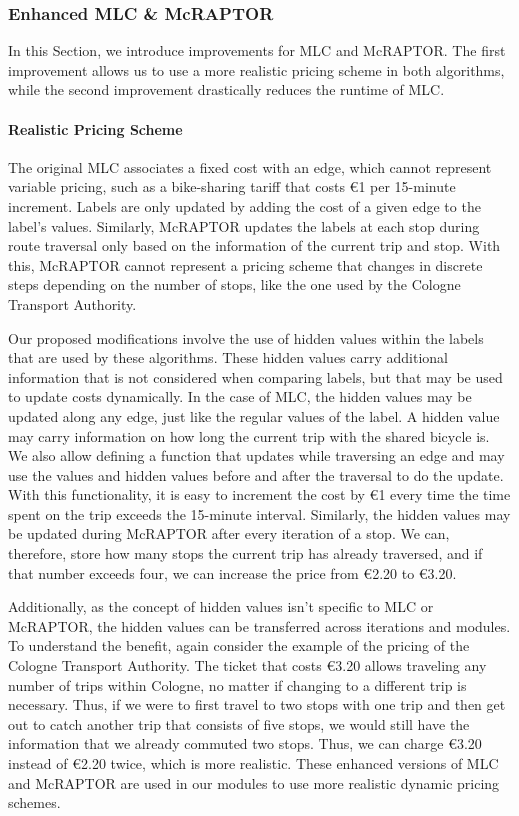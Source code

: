 \subsubsection{Enhanced MLC \& McRAPTOR}
\label{subsubsec:enhanced_mlc_and_mcraptor}
In this Section, we introduce improvements for MLC and McRAPTOR. The first improvement allows us to use a more realistic pricing scheme in both algorithms, while the second improvement drastically reduces the runtime of MLC.

\paragraph{Realistic Pricing Scheme}
The original MLC associates a fixed cost with an edge, which cannot represent variable pricing, such as a bike-sharing tariff that costs \euro{1} per 15-minute increment. 
Labels are only updated by adding the cost of a given edge to the label's values.
Similarly, McRAPTOR updates the labels at each stop during route traversal only based on the information of the current trip and stop. 
With this, McRAPTOR cannot represent a pricing scheme that changes in discrete steps depending on the number of stops, like the one used by the Cologne Transport Authority.

Our proposed modifications involve the use of hidden values within the labels that are used by these algorithms. 
These hidden values carry additional information that is not considered when comparing labels, but that may be used to update costs dynamically.
In the case of MLC, the hidden values may be updated along any edge, just like the regular values of the label.
A hidden value may carry information on how long the current trip with the shared bicycle is.
We also allow defining a function that updates while traversing an edge and may use the values and hidden values before and after the traversal to do the update.
With this functionality, it is easy to increment the cost by \euro{1} every time the time spent on the trip exceeds the 15-minute interval.
Similarly, the hidden values may be updated during McRAPTOR after every iteration of a stop.
We can, therefore, store how many stops the current trip has already traversed, and if that number exceeds four, we can increase the price from \euro{2.20} to \euro{3.20}.

Additionally, as the concept of hidden values isn't specific to MLC or McRAPTOR, the hidden values can be transferred across iterations and modules.
To understand the benefit, again consider the example of the pricing of the Cologne Transport Authority.
The ticket that costs \euro{3.20} allows traveling any number of trips within Cologne, no matter if changing to a different trip is necessary.
Thus, if we were to first travel to two stops with one trip and then get out to catch another trip that consists of five stops, we would still have the information that we already commuted two stops.
Thus, we can charge \euro{3.20} instead of \euro{2.20} twice, which is more realistic.
These enhanced versions of MLC and McRAPTOR are used in our modules to use more realistic dynamic pricing schemes.

